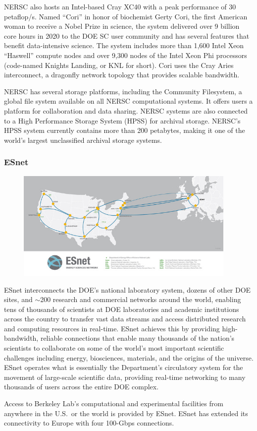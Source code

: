 NERSC also hosts an Intel-based Cray XC40 with a peak performance of 30 petaflop/s. Named ``Cori'' in honor of biochemist Gerty Cori, the first American woman to receive a Nobel Prize in science, the system delivered over 9 billion core hours in 2020 to the DOE SC user community and has several features that benefit data-intensive science. The system includes more than 1,600 Intel Xeon ``Haswell'' compute nodes and over 9,300 nodes of the Intel Xeon Phi processors (code-named Knights Landing, or KNL for short).  Cori uses the Cray Aries interconnect, a dragonfly network topology that provides scalable bandwidth.


NERSC has several storage platforms, including the Community Filesystem, a global file system available on all NERSC computational systems. It offers users a platform for collaboration and data sharing. NERSC systems are also connected to a High Performance Storage System (HPSS) for archival storage. NERSC's HPSS system currently contains more than 200 petabytes, making it one of the world's largest unclassified archival storage systems.


\subsubsection*{ESnet}

\begin{figure}[ht]
  \begin{center}
    \includegraphics[width=0.95\textwidth]
    {images/esnet.jpeg}
  \end{center}
\end{figure}

ESnet interconnects the DOE's national laboratory system, dozens
of other DOE sites, and $\sim$200 research and commercial networks around
the world, enabling tens of thousands of scientists at DOE laboratories
and academic institutions across the country to transfer vast data
streams and access distributed research and computing resources in
real-time. ESnet achieves this by providing high-bandwidth, reliable
connections that enable many thousands of the nation's scientists
to collaborate on some of the world's most important scientific
challenges including energy, biosciences, materials, and the origins
of the universe. ESnet operates what is essentially the Department's
circulatory system for the movement of large-scale scientific data,
providing real-time networking to many thousands of users across
the entire DOE complex.

Access to Berkeley Lab's computational and experimental facilities
from anywhere in the U.S.~or the world is provided by ESnet. ESnet
has extended its connectivity to Europe with four 100-Gbps connections.

